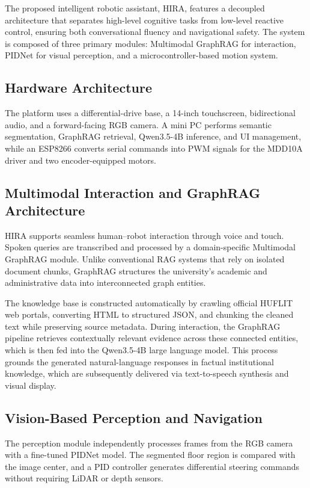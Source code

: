 \documentclass[conference]{IEEEtran}
\begin{document}
The proposed intelligent robotic assistant, HIRA, features a decoupled architecture that separates high-level cognitive tasks from low-level reactive control, ensuring both conversational fluency and navigational safety. The system is composed of three primary modules: Multimodal GraphRAG for interaction, PIDNet for visual perception, and a microcontroller-based motion system.

\subsection{Hardware Architecture}
The platform uses a differential-drive base, a 14-inch touchscreen, bidirectional audio, and a forward-facing RGB camera. A mini PC performs semantic segmentation, GraphRAG retrieval, Qwen3.5-4B inference, and UI management, while an ESP8266 converts serial commands into PWM signals for the MDD10A driver and two encoder-equipped motors.

\subsection{Multimodal Interaction and GraphRAG Architecture}
HIRA supports seamless human--robot interaction through voice and touch. Spoken queries are transcribed and processed by a domain-specific Multimodal GraphRAG module. Unlike conventional RAG systems that rely on isolated document chunks, GraphRAG structures the university's academic and administrative data into interconnected graph entities. 

The knowledge base is constructed automatically by crawling official HUFLIT web portals, converting HTML to structured JSON, and chunking the cleaned text while preserving source metadata. During interaction, the GraphRAG pipeline retrieves contextually relevant evidence across these connected entities, which is then fed into the Qwen3.5-4B large language model. This process grounds the generated natural-language responses in factual institutional knowledge, which are subsequently delivered via text-to-speech synthesis and visual display.

\subsection{Vision-Based Perception and Navigation}
The perception module independently processes frames from the RGB camera with a fine-tuned PIDNet model. The segmented floor region is compared with the image center, and a PID controller generates differential steering commands without requiring LiDAR or depth sensors.
\end{document}
